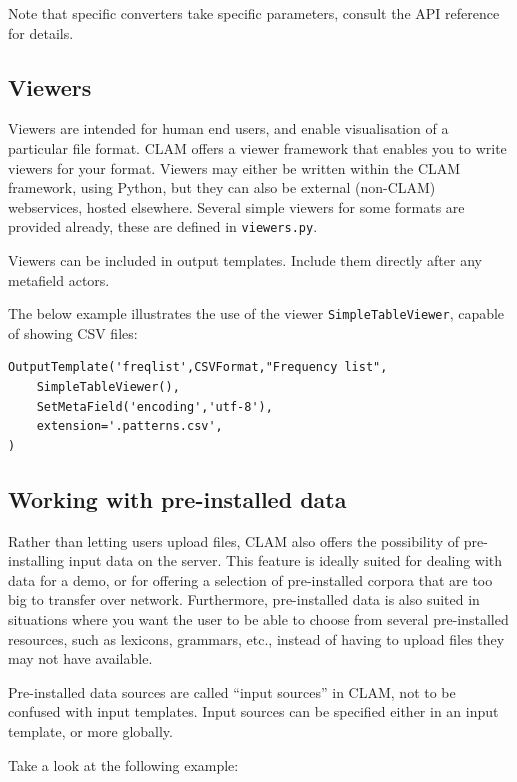 \documentclass[a4paper,12pt]{report}
\begin{document}
Note that specific converters take specific parameters, consult the API reference for details.


\subsection{Viewers}

Viewers are intended for human end users, and enable visualisation of a
particular file format. CLAM offers a viewer framework that enables you to
write viewers for your format. Viewers may either be written within the CLAM
framework, using Python, but they can also be external (non-CLAM) webservices,
hosted elsewhere. Several simple viewers for some formats are provided already,
these are defined in \texttt{viewers.py}.

Viewers can be included in output templates. Include them directly after any
metafield actors.


The below example illustrates the use of the viewer
\texttt{SimpleTableViewer}, capable of showing CSV files:

\begin{verbatim}
OutputTemplate('freqlist',CSVFormat,"Frequency list",
    SimpleTableViewer(),
    SetMetaField('encoding','utf-8'),
    extension='.patterns.csv',
)
\end{verbatim}

\subsection{Working with pre-installed data}

Rather than letting users upload files, CLAM also offers the possibility of
pre-installing input data on the server. This feature is ideally suited for
dealing with data for a demo, or for offering a selection of pre-installed
corpora that are too big to transfer over network. Furthermore, pre-installed
data is also suited in situations where you want the user to be able to choose
from several pre-installed resources, such as lexicons, grammars, etc., instead
of having to upload files they may not have available.

Pre-installed data sources are called ``input sources'' in CLAM, not to be
confused with input templates. Input sources can be specified either in an
input template, or more globally. 

Take a look at the following example:
\end{document}
